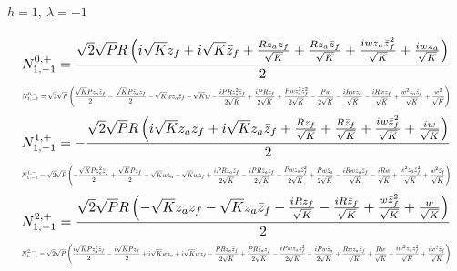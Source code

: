 \documentclass[10pt]{article}
\begin{document}
\paragraph{$h=1,\ \lambda=-1$}
\begin{equation*}
\resizebox{0.98\textwidth}{!}{${\displaystyle N^{0,+}_{1,-1}=\frac{\sqrt{2} \sqrt{P} R \left(i \sqrt{K} z_f + i \sqrt{K} \bar z_f + \frac{R z_a z_f}{\sqrt{K}} + \frac{R z_a \bar z_f}{\sqrt{K}} + \frac{i w z_a \bar z_f^{2}}{\sqrt{K}} + \frac{i w z_a}{\sqrt{K}}\right)}{2}}$}
\end{equation*}
\begin{equation*}
\resizebox{0.98\textwidth}{!}{${\displaystyle N^{0,-}_{1,-1}=\sqrt{2} \sqrt{P} \left(\frac{\sqrt{K} P z_a \bar z_f}{2} - \frac{\sqrt{K} P \bar z_a z_f}{2} - \sqrt{K} w z_a \bar z_f - \sqrt{K} w - \frac{i P R z_a^{2} \bar z_f}{2 \sqrt{K}} + \frac{i P R z_f}{2 \sqrt{K}} + \frac{P w z_a^{2} \bar z_f^{2}}{2 \sqrt{K}} - \frac{P w}{2 \sqrt{K}} - \frac{i R w z_a}{\sqrt{K}} - \frac{i R w z_f}{\sqrt{K}} + \frac{w^{2} z_a \bar z_f}{\sqrt{K}} + \frac{w^{2}}{\sqrt{K}}\right)}$}
\end{equation*}
\begin{equation*}
\resizebox{0.98\textwidth}{!}{${\displaystyle N^{1,+}_{1,-1}=- \frac{\sqrt{2} \sqrt{P} R \left(i \sqrt{K} z_a z_f + i \sqrt{K} z_a \bar z_f + \frac{R z_f}{\sqrt{K}} + \frac{R \bar z_f}{\sqrt{K}} + \frac{i w \bar z_f^{2}}{\sqrt{K}} + \frac{i w}{\sqrt{K}}\right)}{2}}$}
\end{equation*}
\begin{equation*}
\resizebox{0.98\textwidth}{!}{${\displaystyle N^{1,-}_{1,-1}=\sqrt{2} \sqrt{P} \left(- \frac{\sqrt{K} P z_a^{2} \bar z_f}{2} + \frac{\sqrt{K} P z_f}{2} - \sqrt{K} w z_a - \sqrt{K} w z_f + \frac{i P R z_a \bar z_f}{2 \sqrt{K}} - \frac{i P R \bar z_a z_f}{2 \sqrt{K}} - \frac{P w z_a \bar z_f^{2}}{2 \sqrt{K}} + \frac{P w \bar z_a}{2 \sqrt{K}} - \frac{i R w z_a \bar z_f}{\sqrt{K}} - \frac{i R w}{\sqrt{K}} + \frac{w^{2} z_a \bar z_f^{2}}{\sqrt{K}} + \frac{w^{2} \bar z_f}{\sqrt{K}}\right)}$}
\end{equation*}
\begin{equation*}
\resizebox{0.98\textwidth}{!}{${\displaystyle N^{2,+}_{1,-1}=\frac{\sqrt{2} \sqrt{P} R \left(- \sqrt{K} z_a z_f - \sqrt{K} z_a \bar z_f - \frac{i R z_f}{\sqrt{K}} - \frac{i R \bar z_f}{\sqrt{K}} + \frac{w \bar z_f^{2}}{\sqrt{K}} + \frac{w}{\sqrt{K}}\right)}{2}}$}
\end{equation*}
\begin{equation*}
\resizebox{0.98\textwidth}{!}{${\displaystyle N^{2,-}_{1,-1}=\sqrt{2} \sqrt{P} \left(\frac{i \sqrt{K} P z_a^{2} \bar z_f}{2} - \frac{i \sqrt{K} P z_f}{2} + i \sqrt{K} w z_a + i \sqrt{K} w z_f - \frac{P R z_a \bar z_f}{2 \sqrt{K}} + \frac{P R \bar z_a z_f}{2 \sqrt{K}} - \frac{i P w z_a \bar z_f^{2}}{2 \sqrt{K}} + \frac{i P w \bar z_a}{2 \sqrt{K}} + \frac{R w z_a \bar z_f}{\sqrt{K}} + \frac{R w}{\sqrt{K}} + \frac{i w^{2} z_a \bar z_f^{2}}{\sqrt{K}} + \frac{i w^{2} \bar z_f}{\sqrt{K}}\right)}$}
\end{equation*}
\end{document}
